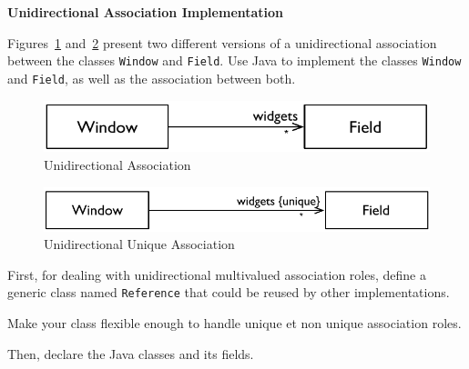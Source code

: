 \documentclass[a4paper,11pt]{memoir}
\newcommand{\code}[1]{\lstinline{#1}}
\begin{document}
\begin{exercise}
	\textbf{Unidirectional Association Implementation}

Figures~\ref{fig:unidirectional} and~\ref{fig:unique} present two different versions of a unidirectional association between the classes \code{Window} and \code{Field}.
Use Java to implement the classes \code{Window} and \code{Field}, as well as the association between both.

\begin{figure}[htbp]
	\centering
	\includegraphics[scale=.8]{CD-WindowFieldUni.pdf}
	\caption{Unidirectional Association}
	\label{fig:unidirectional}
\end{figure}

\begin{figure}[htbp]
	\centering
		\includegraphics[scale=.8]{CD-WindowFieldUnique.pdf}
	\caption{Unidirectional Unique Association}
	\label{fig:unique}
\end{figure}



\begin{inparaenum}[(A)]
	\item First, for dealing with unidirectional multivalued association roles, define a generic class named \code{Reference} that could be reused by other implementations.
	\item Make your class flexible enough to handle unique et non unique association roles.
	\item Then, declare the Java classes and its fields.
\end{inparaenum}

\end{exercise}

\begin{solution}
		\lstset{language=Java}
		
			
\end{solution}
\end{document}
